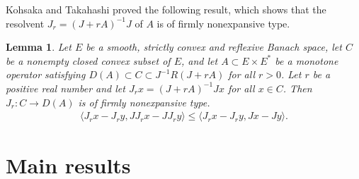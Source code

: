 \documentclass[12pt,a4paper]{amsart}
\newtheorem{lemma}[theorem]{Lemma}
\theoremstyle{definition}
\numberwithin{equation}{section}
\begin{document}
Kohsaka and Takahashi \cite{KT} proved the following result, which shows that the resolvent \( J_{r} = (J + rA)^{-1}J \) of \( A \) is of firmly nonexpansive type.
\begin{lemma}\cite{KT}\label{risfnt}
Let \( E \) be a smooth, strictly convex and reflexive Banach space, let \( C \) be a nonempty closed convex subset of \( E \), and let \( A \subset E \times E^* \) be a monotone operator satisfying $D(A) \subset C \subset J^{-1}R(J + rA)$ for all \( r > 0 \). Let \( r \) be a positive real number and let \( J_r x = (J + rA)^{-1} Jx \) for all \( x \in C \). Then \( J_r : C \to D(A) \) is of firmly nonexpansive type.
\begin{align}
  \langle J_r x - J_r y, J J_r x - J J_r y \rangle \leq \langle J_r x - J_r y, Jx - Jy \rangle.
\end{align}
\end{lemma}
\section{Main results}
\end{document}
